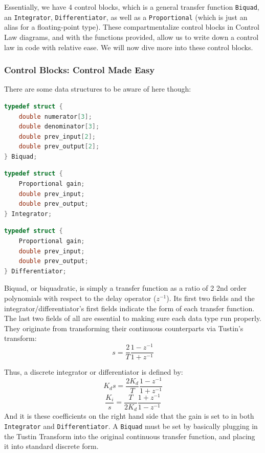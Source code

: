 \documentclass[letterpaper]{article}
\begin{document}
Essentially, we have 4 control blocks, which is a general transfer function \texttt{Biquad}, an \texttt{Integrator}, \texttt{Differentiator}, as well as a \texttt{Proportional} (which is just an alias for a floating-point type). These compartmentalize control blocks in Control Law diagrams, and with the functions provided, allow us to write down a control law in code with relative ease. We will now dive more into these control blocks.

\subsubsection{Control Blocks: Control Made Easy}
There are some data structures to be aware of here though:
\begin{multicols}{3}
    \begin{center}
        \begin{lstlisting}[language=C]
typedef struct {
    double numerator[3];
    double denominator[3];
    double prev_input[2];
    double prev_output[2];
} Biquad;
        \end{lstlisting}
    \end{center}
    \columnbreak
    \begin{center}
        \begin{lstlisting}[language=C]
typedef struct {
    Proportional gain;
    double prev_input;
    double prev_output;
} Integrator;
        \end{lstlisting}
    \end{center}
    \columnbreak
    \begin{center}
    \begin{lstlisting}[language=C]
typedef struct {
    Proportional gain;
    double prev_input;
    double prev_output;
} Differentiator;    
    \end{lstlisting}
    \end{center}
\end{multicols}

Biquad, or biquadratic, is simply a transfer function as a ratio of 2 2nd order polynomials with respect to the delay operator ($z^{-1}$). Its first two fields and the integrator/differentiator's first fields indicate the form of each transfer function. The last two fields of all are essential to making sure each data type run properly. They originate from transforming their continuous counterparts via Tustin's transform:
$$\boxed{s = \frac{2}{T}\frac{1-z^{-1}}{1+z^{-1}}}$$

Thus, a discrete integrator or differentiator is defined by:
$$\boxed{K_ds = \frac{2K_d}{T}\frac{1-z^{-1}}{1+z^{-1}}}$$
$$\boxed{\frac{K_i}{s} = \frac{T}{2K_d}\frac{1+z^{-1}}{1-z^{-1}}}$$
And it is these coefficients on the right hand side that the gain is set to in both \texttt{Integrator} and \texttt{Differentiator}. A \texttt{Biquad} must be set by basically plugging in the Tustin Transform into the original continuous transfer function, and placing it into standard discrete form.
\end{document}
